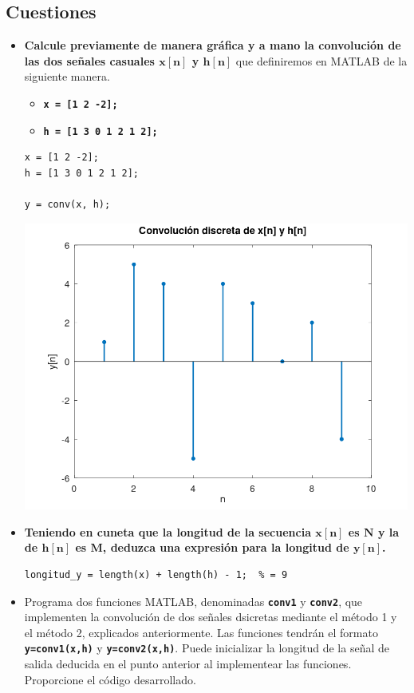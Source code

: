 \documentclass[12pt]{article}
\newcommand{\code}[1]{\texttt{\textbf{#1}}}
\begin{document}
\subsection*{Cuestiones}
\begin{itemize}[leftmargin=*]
	\item \textbf{Calcule previamente de manera gráfica y a mano la convolución de las dos señales casuales $\mathbf{x[n]}$ y $\mathbf{h[n]}$} que definiremos en MATLAB de la siguiente manera.
	\begin{itemize}[label=\textbullet]
		\item \code{x = [1 2 -2];}
		\item \code{h = [1 3 0 1 2 1 2];}
	\end{itemize}
	
\begin{lstlisting}
x = [1 2 -2];
h = [1 3 0 1 2 1 2];

y = conv(x, h);
\end{lstlisting}

\begin{center}
	\includegraphics[width=0.7\linewidth]{Imágenes/Figura1}
\end{center}

	\item \textbf{Teniendo en cuneta que la longitud de la secuencia $\mathbf{x[n]}$ es $\mathbf{N}$ y la de $\mathbf{h[n]}$ es $\mathbf{M}$, deduzca una expresión para la longitud de $\mathbf{y[n]}$.}
	
	\begin{lstlisting}
longitud_y = length(x) + length(h) - 1;  % = 9
	\end{lstlisting}
	
	\item Programa dos funciones MATLAB, denominadas \code{conv1} y \code{conv2}, que implementen la convolución de dos señales dsicretas mediante el método 1 y el método 2, explicados anteriormente. Las funciones tendrán el formato \code{y=conv1(x,h)} y \code{y=conv2(x,h)}. Puede inicializar la longitud de la señal de salida deducida en el punto anterior al implementear las funciones. Proporcione el código desarrollado.
	

\end{itemize}
\end{document}
